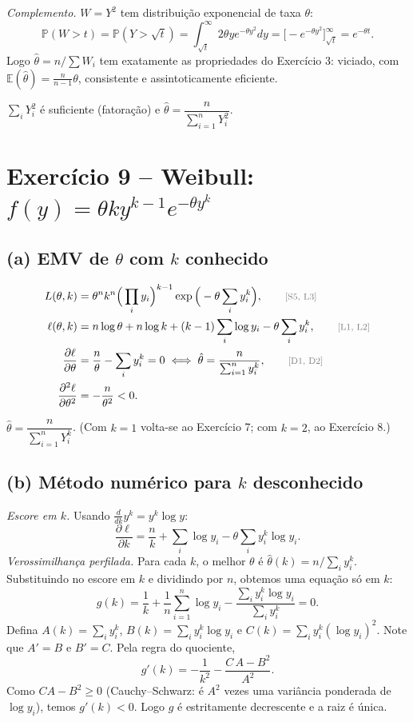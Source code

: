 \documentclass[11pt,a4paper]{article}
\newcommand{\E}{\mathbb{E}}
\newcommand{\Prob}{\mathbb{P}}
\newcommand{\just}[1]{\tag*{\footnotesize\textcolor{gray}{[#1]}}}
\theoremstyle{definition}
\theoremstyle{plain}
\begin{document}
\textit{Complemento.} $W=Y^2$ tem distribuição exponencial de taxa $\theta$:
\[
\Prob(W>t)=\Prob(Y>\sqrt t)=\int_{\sqrt t}^\infty2\theta ye^{-\theta y^2}dy=\Big[-e^{-\theta y^2}\Big]_{\sqrt t}^\infty=e^{-\theta t}.
\]
Logo $\hat\theta=n/\sum W_i$ tem exatamente as propriedades do Exercício 3: viciado, com $\E(\hat\theta)=\frac{n}{n-1}\theta$, consistente e assintoticamente eficiente.

\begin{resposta}
$\sum_iY_i^2$ é suficiente (fatoração) e $\hat\theta=\dfrac{n}{\sum_{i=1}^nY_i^2}$.
\end{resposta}

\section{Exercício 9 -- Weibull: $f(y)=\theta ky^{k-1}e^{-\theta y^k}$}

\subsection*{(a) EMV de $\theta$ com $k$ conhecido}
\begin{align*}
L(\theta,k)&=\theta^nk^n\Big(\prod_iy_i\Big)^{k-1}\exp\Big(-\theta\sum_iy_i^k\Big), \just{S5, L3}\\
\ell(\theta,k)&=n\log\theta+n\log k+(k-1)\sum_i\log y_i-\theta\sum_iy_i^k, \just{L1, L2}\\
\frac{\partial\ell}{\partial\theta}&=\frac n\theta-\sum_iy_i^k=0\iff\hat\theta=\frac{n}{\sum_{i=1}^ny_i^k}, \just{D1, D2}\\
\frac{\partial^2\ell}{\partial\theta^2}&=-\frac{n}{\theta^2}<0 .
\end{align*}
\begin{resposta}
$\hat\theta=\dfrac{n}{\sum_{i=1}^nY_i^k}$. (Com $k=1$ volta-se ao Exercício 7; com $k=2$, ao Exercício 8.)
\end{resposta}

\subsection*{(b) Método numérico para $k$ desconhecido}
\textit{Escore em $k$.} Usando $\frac{d}{dk}y^k=y^k\log y$:
\[
\frac{\partial\ell}{\partial k}=\frac nk+\sum_i\log y_i-\theta\sum_iy_i^k\log y_i .
\]
\textit{Verossimilhança perfilada.} Para cada $k$, o melhor $\theta$ é $\hat\theta(k)=n/\sum_iy_i^k$. Substituindo no escore em $k$ e dividindo por $n$, obtemos uma equação só em $k$:
\[
g(k)=\frac1k+\frac1n\sum_{i=1}^n\log y_i-\frac{\sum_iy_i^k\log y_i}{\sum_iy_i^k}=0 .
\]
Defina $A(k)=\sum_iy_i^k$, $B(k)=\sum_iy_i^k\log y_i$ e $C(k)=\sum_iy_i^k(\log y_i)^2$. Note que $A'=B$ e $B'=C$. Pela regra do quociente,
\[
g'(k)=-\frac{1}{k^2}-\frac{C\,A-B^2}{A^2}.
\]
Como $CA-B^2\ge0$ (Cauchy--Schwarz: é $A^2$ vezes uma variância ponderada de $\log y_i$), temos $g'(k)<0$. Logo $g$ é estritamente decrescente e a raiz é única.
\end{document}
